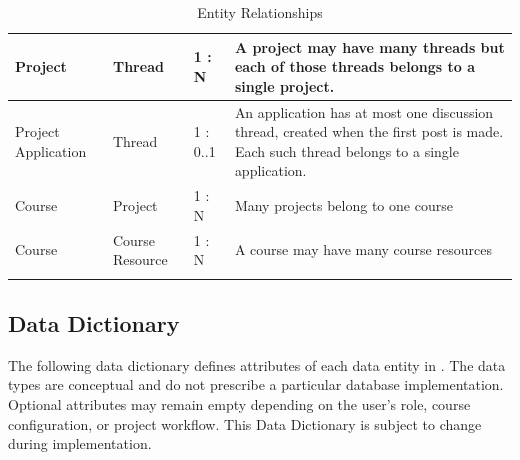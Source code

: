\documentclass[12pt]{article}
\begin{document}
\begin{longtable}{|p{2cm}|p{2cm}|p{2.5cm}|p{8cm}|}
    Project & Thread & 1 : N & A project may have many threads but each of those threads belongs to a single project.\\ \hline
    Project Application & Thread & 1 : 0..1 & An application has at most one discussion thread, created when the first post is made. Each such thread belongs to a single application.\\ \hline
    Course & Project & 1 : N & Many projects belong to one course\\ \hline
    Course & Course Resource & 1 : N & A course may have many course resources\\ \hline
    \caption{Entity Relationships} \label{tab:EntityRelationships}
  \end{longtable}

  \subsection{Data Dictionary}\label{sec:dictionary}


  The following data dictionary defines attributes of each data entity in \projname{}. The data
  types are conceptual and do not prescribe a particular database implementation. Optional attributes may remain
  empty depending on the user's role, course configuration, or project workflow. This Data Dictionary is subject
  to change during implementation.

  \begingroup
  \small
  \setlength{\tabcolsep}{5pt}
  \renewcommand{\arraystretch}{1.25}
\end{document}
